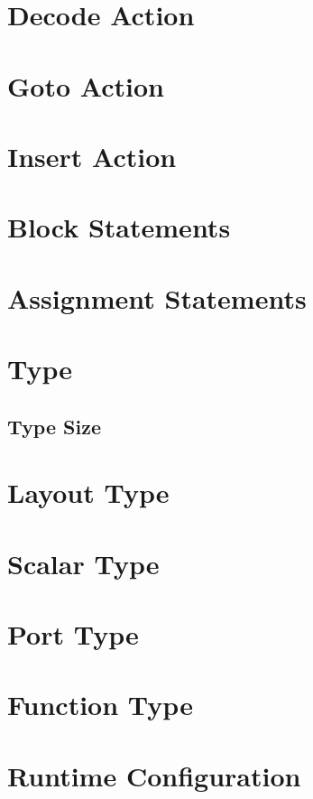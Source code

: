 \section{Decode Action} \label{decode_guide}

\section{Goto Action} \label{goto_guide}

\section{Insert Action} \label{insert_guide}

\section{Block Statements} \label{block_stmt_guide}

\section{Assignment Statements} \label{assign_stmt_guide}

\section{Type} \label{type_guide}

\subsection{Type Size} \label{type_size}

\section{Layout Type} \label{layout_type_guide}

\section{Scalar Type} \label{scalar_type_guide}

\section{Port Type} \label{port_type_guide}

\section{Function Type} \label{function_type_guide}

\section{Runtime Configuration} \label{config_guide}

